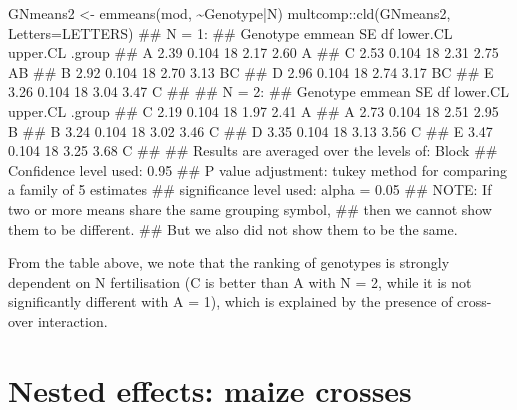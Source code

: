 \documentclass[a4paper,12pt,oneside]{book}
\newenvironment{Shaded}{\begin{snugshade}}{\end{snugshade}}
\newcommand{\SpecialCharTok}[1]{#1}
\newcommand{\DocumentationTok}[1]{#1}
\newcommand{\OtherTok}[1]{#1}
\newcommand{\FunctionTok}[1]{#1}
\newcommand{\AttributeTok}[1]{#1}
\newcommand{\AlertTok}[1]{#1}
\newcommand{\NormalTok}[1]{#1}
\begin{document}
\vspace{12pt}

\begin{Shaded}
\begin{Highlighting}[]
\NormalTok{GNmeans2 }\OtherTok{\textless{}{-}} \FunctionTok{emmeans}\NormalTok{(mod, }\SpecialCharTok{\textasciitilde{}}\NormalTok{Genotype}\SpecialCharTok{|}\NormalTok{N)}
\NormalTok{multcomp}\SpecialCharTok{::}\FunctionTok{cld}\NormalTok{(GNmeans2, }\AttributeTok{Letters=}\NormalTok{LETTERS)}
\DocumentationTok{\#\# N = 1:}
\DocumentationTok{\#\#  Genotype emmean    SE df lower.CL upper.CL .group}
\DocumentationTok{\#\#  A          2.39 0.104 18     2.17     2.60  A    }
\DocumentationTok{\#\#  C          2.53 0.104 18     2.31     2.75  AB   }
\DocumentationTok{\#\#  B          2.92 0.104 18     2.70     3.13   BC  }
\DocumentationTok{\#\#  D          2.96 0.104 18     2.74     3.17   BC  }
\DocumentationTok{\#\#  E          3.26 0.104 18     3.04     3.47    C  }
\DocumentationTok{\#\# }
\DocumentationTok{\#\# N = 2:}
\DocumentationTok{\#\#  Genotype emmean    SE df lower.CL upper.CL .group}
\DocumentationTok{\#\#  C          2.19 0.104 18     1.97     2.41  A    }
\DocumentationTok{\#\#  A          2.73 0.104 18     2.51     2.95   B   }
\DocumentationTok{\#\#  B          3.24 0.104 18     3.02     3.46    C  }
\DocumentationTok{\#\#  D          3.35 0.104 18     3.13     3.56    C  }
\DocumentationTok{\#\#  E          3.47 0.104 18     3.25     3.68    C  }
\DocumentationTok{\#\# }
\DocumentationTok{\#\# Results are averaged over the levels of: Block }
\DocumentationTok{\#\# Confidence level used: 0.95 }
\DocumentationTok{\#\# P value adjustment: tukey method for comparing a family of 5 estimates }
\DocumentationTok{\#\# significance level used: alpha = 0.05 }
\DocumentationTok{\#\# }\AlertTok{NOTE}\DocumentationTok{: If two or more means share the same grouping symbol,}
\DocumentationTok{\#\#       then we cannot show them to be different.}
\DocumentationTok{\#\#       But we also did not show them to be the same.}
\end{Highlighting}
\end{Shaded}

From the table above, we note that the ranking of genotypes is strongly dependent on N fertilisation (C is better than A with N = 2, while it is not significantly different with A = 1), which is explained by the presence of cross-over interaction.

\hypertarget{nested-effects-maize-crosses}{%
\section{Nested effects: maize crosses}\label{nested-effects-maize-crosses}}
\end{document}
